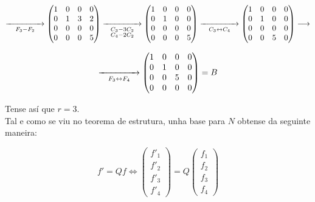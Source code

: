 \documentclass[twoside]{report}
\theoremstyle{mystyle}
\begin{document}
\[
\underset{F_{3} - F_{2}}{\xrightarrow{\hspace{15mm}}}
\begin{pmatrix}
1 & 0 & 0 & 0\\
0 & 1 & 3 & 2\\
0 & 0 & 0 & 0\\
0 & 0 & 0 & 5
\end{pmatrix}
\underset{\substack{C_{3} - 3C_{2} \\ C_{4} - 2C_{2}}}{\xrightarrow{\hspace{15mm}}}
\begin{pmatrix}
1 & 0 & 0 & 0\\
0 & 1 & 0 & 0\\
0 & 0 & 0 & 0\\
0 & 0 & 0 & 5
\end{pmatrix}
\underset{C_{3} \leftrightarrow C_{4}}{\xrightarrow{\hspace{15mm}}}
\begin{pmatrix}
1 & 0 & 0 & 0\\
0 & 1 & 0 & 0\\
0 & 0 & 0 & 0\\
0 & 0 & 5 & 0
\end{pmatrix}
\longrightarrow
\]

\vspace{3mm}

\[
\underset{F_{3} \leftrightarrow F_{4}}{\xrightarrow{\hspace{15mm}}}
\begin{pmatrix}
1 & 0 & 0 & 0\\
0 & 1 & 0 & 0\\
0 & 0 & 5 & 0\\
0 & 0 & 0 & 0
\end{pmatrix}
= B
\]

\vspace{3mm}

\noindent Tense así que $r = 3$. \\

\noindent Tal e como se viu no teorema de estrutura, unha base para $N$ obtense da seguinte maneira:

\[
f' = Qf 
\Longleftrightarrow 
\begin{pmatrix}
f'_{1}\\
f'_{2}\\
f'_{3}\\
f'_{4}
\end{pmatrix}
=
Q
\begin{pmatrix}
f_{1}\\
f_{2}\\
f_{3}\\
f_{4}
\end{pmatrix}
\]
\end{document}
